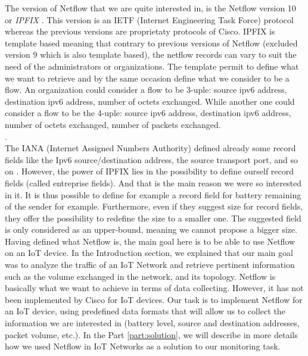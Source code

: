 The version of Netflow that we are quite interested in, is the Netflow version 10 or \textit{IPFIX} \cite{claise2013rfc}. This version is an IETF (Internet Engineering Task Force) protocol whereas the previous versions are proprietaty protocols of Cisco. IPFIX is template based meaning that contrary to previous versions of Netflow (excluded version 9 which is also template based), the netflow records can vary to suit the need of the administrators or organizations. The template permit to define what we want to retrieve and by the same occasion define what we consider to be a flow. An organization could consider a flow to be 3-uple: source ipv6 address, destination ipv6 address, number of octets exchanged. While another one could consider a flow to be the 4-uple: source ipv6 address, destination ipv6 address, number of octets exchanged, number of packets exchanged. \\

.\\
The IANA (Internet Assigned Numbers Authority) defined already some record fields like the Ipv6 source/destination address, the source transport port, and so on \cite{website:ipfix_entities}. However, the power of IPFIX lies in the possibility to define ourself record fields (called entreprise fields). And that is the main reason we were so interested in it. It is thus possible to define for example a record field for battery remaining of the sender for example. Furthermore, even if they suggest size for record fields, they offer the possibility to redefine the size to a smaller one. The suggested field is only considered as an upper-bound, meaning we cannot propose a bigger size.\\

Having defined what Netflow is, the main goal here is to be able to use Netflow on an IoT device. In the Introduction section, we explained that our main goal was to analyze the traffic of an IoT Network and retrieve pertinent information such as the volume exchanged in the network, and its topology. Netflow is basically what we want to achieve in terms of data collecting. However, it has not been implemented by Cisco for IoT devices. Our task is to implement Netflow for an IoT device, using predefined data formats that will allow us to collect the information we are interested in (battery level, source and destination addresses, packet volume, etc.). In the Part \ref{part:solution}, we will describe in more details how we used Netflow in IoT Networks as a solution to our monitoring task.

